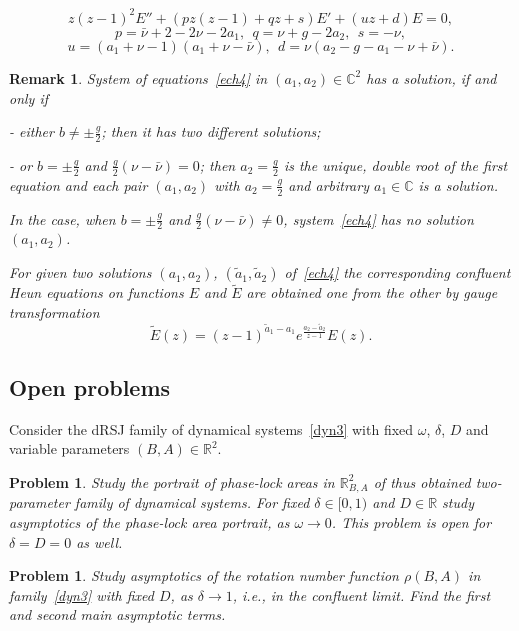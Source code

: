 \documentclass[preprint,12pt]{elsarticle}
\theoremstyle{plain}
\newtheorem{remark}[theorem]{Remark}
\newtheorem{problem}[theorem]{Problem}
\def\wt#1{\widetilde#1}
\numberwithin{equation}{section}
\numberwithin{equation}{section}
\begin{document}
\begin{equation}z(z-1)^2E''+(pz(z-1)+qz+s)E'+(uz+d)E=0,\label{heunc4}\end{equation}
$$p=\bar\nu+2-2\nu-2a_1, \ \ q=\nu+g-2a_2, \ \ s=-\nu,$$
 \begin{equation} u=(a_1+\nu-1)(a_1+\nu-\bar\nu), \ \ d=\nu(a_2-g-a_1-\nu+\bar\nu).\label{coefl4}
 \end{equation}
\begin{remark} 
System of equations~\eqref{ech4} in $(a_1,a_2)\in\mathbb{C}^2$ has a solution, if and only if 

- either $b\neq\pm\frac g2$; then it has two different 
solutions;

- or $b=\pm\frac g2$ and $\frac g2(\nu-\bar\nu)=0$; then $a_2=\frac g2$ is the  unique, double root of the first equation and 
each pair $(a_1,a_2)$ with $a_2=\frac g2$ and arbitrary $a_1\in\mathbb{C}$ is a solution. 

In the case, when $b=\pm\frac g2$ and $\frac g2(\nu-\bar\nu)\neq0$, system~\eqref{ech4} has no solution $(a_1,a_2)$. 

For  given two solutions $(a_1,a_2)$, $(\wt a_1,\wt a_2)$ of~\eqref{ech4} the corresponding confluent 
Heun equations on functions $E$ and $\wt E$ are obtained one from the other by gauge transformation
$$\wt E(z)=(z-1)^{\wt a_1-a_1}e^{\frac{a_2-\wt a_2}{z-1}}E(z).$$
\end{remark}

\subsection{Open problems}\label{subsec:open-problems}

Consider the dRSJ family of dynamical systems~\eqref{dyn3} with fixed $\omega$, $\delta$, $D$ and variable parameters $(B,A)\in\mathbb{R}^2$. 

\begin{problem} Study the portrait of phase-lock areas in $\mathbb{R}^2_{B,A}$ of thus obtained two-parameter family of 
dynamical systems. For fixed $\delta\in[0,1)$ and $D\in\mathbb{R}$ study asymptotics of the phase-lock area portrait, as $\omega\to0$. This problem is open for $\delta=D=0$ as well.
\end{problem}

\begin{problem} Study asymptotics of the rotation number function $\rho(B,A)$ in family~\eqref{dyn3} with fixed $D$, as $\delta\to1$, i.e., in the confluent limit. Find the first and second main asymptotic terms. 
\end{problem}
\end{document}
